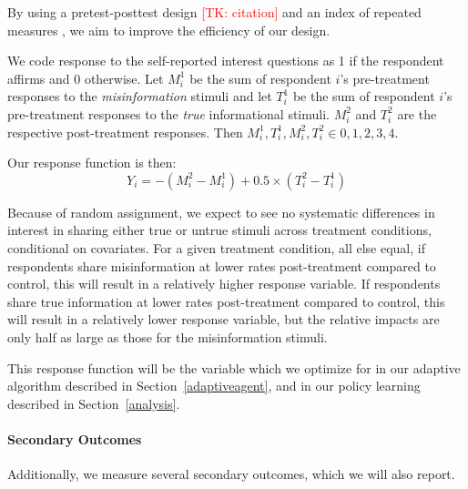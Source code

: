 \documentclass[letterpaper, 12pt, parskip=full,]{scrartcl}
\begin{document}
By using a pretest-posttest design \textcolor{red}{[TK: citation]} and an index of repeated measures \citep{broockman2017design}, we aim to improve the efficiency of our design. 


We code response to the self-reported interest questions as 1 if the respondent affirms and 0 otherwise. Let $M_i^1$ be the sum of respondent $i$'s pre-treatment responses to the \textit{misinformation} stimuli and let $T_i^1$ be the sum of respondent $i$'s pre-treatment responses to the \textit{true} informational stimuli. $M_i^2$ and $T_i^2$ are the respective post-treatment responses. Then $M_i^1, T_i^1, M_i^2, T_i^2 \in {0,1,2,3,4}$. 

Our response function is then:
\[
Y_i = -(M_i^2 - M_i^1) + 0.5 \times (T_i^2 - T_i^1)
\]

Because of random assignment, we expect to see no systematic differences in interest in sharing either true or untrue stimuli across treatment conditions, conditional on covariates. For a given treatment condition, all else equal, if respondents share misinformation at lower rates post-treatment compared to control, this will result in a relatively higher response variable. If respondents share true information at lower rates post-treatment compared to control, this will result in a relatively lower response variable, but the relative impacts are only half as large as those for the misinformation stimuli. 

This response function will be the variable which we optimize for in our adaptive algorithm described in Section~\ref{adaptiveagent}, and in our policy learning described in Section~\ref{analysis}. 

\paragraph{Secondary Outcomes}
Additionally, we measure several secondary outcomes, which we will also report. 

\end{document}
